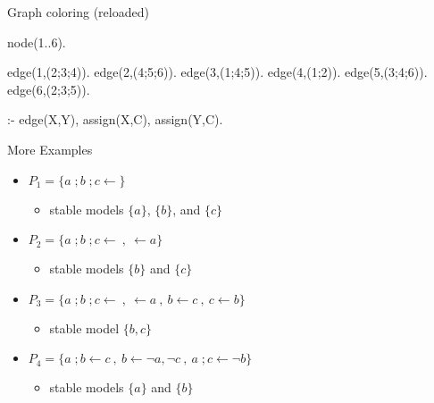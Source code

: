 \begin{frame}[fragile]{Graph coloring (reloaded)}
\begin{semiverbatim}
node(1..6).

edge(1,(2;3;4)).  edge(2,(4;5;6)).  edge(3,(1;4;5)).
edge(4,(1;2)).    edge(5,(3;4;6)).  edge(6,(2;3;5)).


:- edge(X,Y), assign(X,C), assign(Y,C).
\end{semiverbatim}
\end{frame}
\begin{frame}{More Examples}
  \bigskip
  \begin{itemize}\itemsep 2ex
  \item<1-2,9>
    \(
    P_1=\{a\;;b\;;c\leftarrow\}
    \)
    \begin{itemize}
    \item<2,9> stable models $\{a\}$, $\{b\}$, and $\{c\}$
    \end{itemize}
  \item<3-4,9>
    \(
    P_2=\{a\;;b\;;c\leftarrow \ ,\ \leftarrow a\}
    \)
    \begin{itemize}
    \item<4,9> stable models $\{b\}$ and $\{c\}$\pause
    \end{itemize}
  \item<5-6,9>
    \(
    P_3=\{a\;;b\;;c\leftarrow \ ,\ \leftarrow a\ ,\ b \leftarrow c\ ,\ c \leftarrow b  \}
    \)
    \begin{itemize}
    \item<6,9> stable model $\{b,c\}$
    \end{itemize}
  \item<7-8,9>
    \(
    P_4=\{a\;;b\leftarrow c\ ,\ b \leftarrow {\neg a}, {\neg c}\ ,\ a\;;c \leftarrow {\neg b}  \}
    \)
    \begin{itemize}
    \item<8,9> stable models $\{a\}$ and $\{b\}$
    \end{itemize}
  \end{itemize}
\end{frame}
